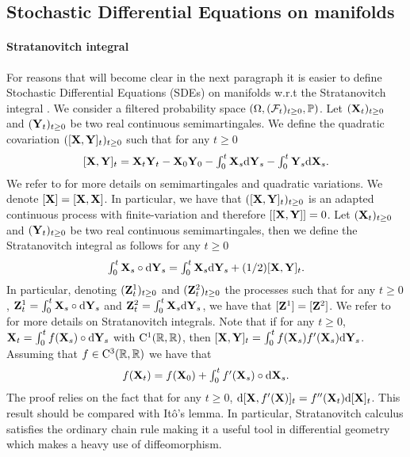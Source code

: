 \subsection{Stochastic Differential Equations on manifolds}
\label{sec:stoch-diff-equat}


\paragraph{Stratanovitch integral} For reasons that will become clear in the
next paragraph it is easier to define Stochastic Differential Equations (SDEs)
on manifolds w.r.t the Stratanovitch integral \cite[Part II, Chapter
3]{kloeden:platen:2011}. We consider a filtered probability space
$(\Omega, (\mathcal{F}_t)_{t \geq 0}, \mathbb{P})$. Let $(\mathbf{X}_t)_{t \geq 0}$ and
$(\mathbf{Y}_t)_{t \geq 0}$ be two real continuous semimartingales. We define the
quadratic covariation $([\mathbf{X},\mathbf{Y}]_t)_{t \geq 0}$ such that for any $t \geq 0$
\begin{equation}
  \textstyle{[\mathbf{X},\mathbf{Y}]_t = \mathbf{X}_t \mathbf{Y}_t - \mathbf{X}_0\mathbf{Y}_0 - \int_0^t \mathbf{X}_s \mathrm{d}\mathbf{Y}_s - \int_0^t \mathbf{Y}_s \mathrm{d}\mathbf{X}_s  . }
\end{equation}
We refer to \citet[Chapter IV]{revuz1999continuous} for more details on
semimartingales and quadratic variations. We denote $[\mathbf{X}] = [\mathbf{X}, \mathbf{X}]$. In
particular, we have that $([\mathbf{X}, \mathbf{Y}]_t)_{t \geq 0}$ is an adapted continuous
process with finite-variation and therefore $[[\mathbf{X}, \mathbf{Y}]] = 0$. Let
$(\mathbf{X}_t)_{t \geq 0}$ and $(\mathbf{Y}_t)_{t \geq 0}$ be two real continuous
semimartingales, then we define the Stratanovitch integral as follows for any
$t \geq 0$
\begin{equation}
  \textstyle{ \int_0^t \mathbf{X}_s \circ \mathrm{d}\mathbf{Y}_s = \int_0^t \mathbf{X}_s \mathrm{d}\mathbf{Y}_s + (1/2) [\mathbf{X}, \mathbf{Y}]_t  . }
\end{equation}
In particular, denoting $(\mathbf{Z}_t^1)_{t \geq 0}$ and $(\mathbf{Z}_t^2)_{t \geq 0}$ the
processes such that for any $t \geq 0$,
$\mathbf{Z}_t^1 = \int_0^t \mathbf{X}_s \circ \mathrm{d} \mathbf{Y}_s$ and
$\mathbf{Z}_t^2 = \int_0^t \mathbf{X}_s \mathrm{d} \mathbf{Y}_s$, we have that $[\mathbf{Z}^1] = [\mathbf{Z}^2]$. We
refer to \cite{kurtz1995stratonovich} for more details on Stratanovitch
integrals. Note that if for any $t \geq 0$,
$\mathbf{X}_t = \int_0^t f(\mathbf{X}_s) \circ \mathrm{d} \mathbf{Y}_s$ with $\mathrm{C}^1(\mathbb{R}, \mathbb{R})$,
then $[\mathbf{X}, \mathbf{Y}]_t = \int_0^t f(\mathbf{X}_s) f'(\mathbf{X}_s) \mathrm{d} \mathbf{Y}_s$. Assuming that
$f \in \mathrm{C}^3(\mathbb{R}, \mathbb{R})$ we have that \cite[Chapter IV, Exercise
3.15]{revuz1999continuous}
\begin{equation}
  \label{eq:stratanovitch_lemma}
  \textstyle{ f(\mathbf{X}_t) = f(\mathbf{X}_0) + \int_0^t f'(\mathbf{X}_s) \circ \mathrm{d}\mathbf{X}_s  .}
\end{equation}
The proof relies on the fact that for any $t \geq 0$,
$\mathrm{d} [\mathbf{X}, f'(\mathbf{X})]_t = f''(\mathbf{X}_t) \mathrm{d} [\mathbf{X}]_t$.  This result should be
compared with It\^o's lemma. In particular, Stratanovitch calculus satisfies the
ordinary chain rule making it a useful tool in differential geometry which
makes a heavy use of diffeomorphism.

